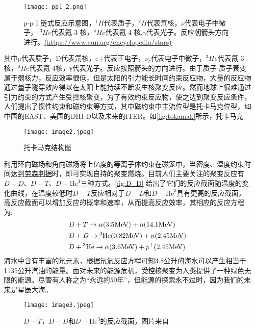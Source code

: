 \begin{figure}[ht]
\centering
\texttt{[image: ppl\_2.png]}
\caption{\label{fig:ppI} p-p I 链式反应示意图，$^1H$代表质子，$^2H$代表氘核，$ν$代表电子中微子，
$^3He$代表氦-3 核，$^4He$代表氦-4 核,$γ$代表光子。反应朝箭头方向进行。\href{https://www.sun.org/encyclopedia/stars}{(https://www.sun.org/encyclopedia/stars)}
}
\end{figure}
\noindent     其中p代表质子，D代表氘核，e+代表正电子，$\nu_e$代表电子中微子，$^3He$代表氦-3核，$^4He$代表氦-4核，γ代表光子。反应按照箭头的方向进行。由于质子-质子衰变属于弱核力，反应效率很低，但是太阳的引力能长时间约束反应物，大量的反应物通过量子隧穿效应得以在太阳上能持续不断发生核聚变反应。然而地球上很难通过引力约束的方式产生受控核聚变，为了有效约束反应物，使之达到聚变反应条件，人们提出了惯性约束和磁约束等方式，其中磁约束中主流位型是托卡马克位型，如中国的EAST、美国的DIII-D以及未来的ITER。如\autoref{fig:tokamak}所示，托卡马克
\begin{figure}[ht]
\centering
\texttt{[image: image2.jpeg]}
\caption{\label{fig:tokamak} 托卡马克结构图\cite{RN950}}
\end{figure}
利用环向磁场和角向磁场将上亿度的等离子体约束在磁笼中，当密度、温度约束时间达到\href{https://www.energyencyclopedia.com/en/nuclear-fusion/thermonuclear-fusion/lawson-criterion}{劳森判据}时，即可实现自持的聚变燃烧。目前人们主要关注的聚变反应有$D-D$、$D-T$、$D-\text{He}^3$三种方式。\autoref{fig:D_D} 给出了它们的反应截面随温度的变化曲线，在温度较低时$D-T$反应相对于$D-D$和$D-\text{He}^3$具有更高的反应截面，高反应截面可以增加反应的概率和速率，从而提高反应效率，其相应的反应方程为:
\begin{equation*}
\begin{aligned}
&D+T\to\alpha(3.5{\mathrm{MeV}})+n(14.1{\mathrm{MeV}})\\
&D+D\to{}^3\text{He}(0.82{\mathrm{MeV}})+n(2.45{\mathrm{MeV}})\\
&D+{}^3\text{He}\to\alpha(3.6{\mathrm{MeV}})+p^+(2.45{\mathrm{MeV}})\\
\end{aligned}
\end{equation*}
海水中含有丰富的氘元素，根据氘氚反应方程可知3.8公升的海水可以产生相当于1135公升汽油的能量。面对未来的能源危机，受控核聚变为人类提供了一种绿色无限的能源。尽管有人称之为“永远的50年”，但能源的探索永不过时，因为我们的未来是星辰大海。
\begin{figure}[ht]
\centering
\texttt{[image: image3.jpeg]}
\caption{\label{fig:D_D} $D-T$，$D-D$和$D-\text{He}^3$的反应截面，图片来自\cite{RN1698}}
\end{figure}
\clearpage
